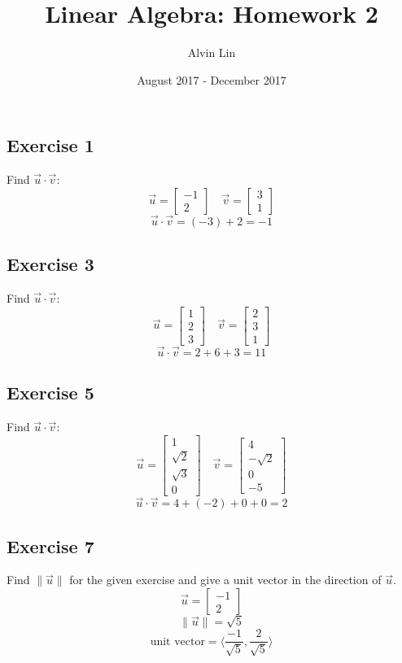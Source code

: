 \documentclass[letterpaper, 12pt]{math}
\title{Linear Algebra: Homework 2}
\author{Alvin Lin}
\date{August 2017 - December 2017}
\begin{document}
\maketitle

\subsection*{Exercise 1}
Find \( \vec{u}\cdot\vec{v} \):
\[ \vec{u} = \begin{bmatrix}-1 \\ 2\end{bmatrix} \quad
  \vec{v} = \begin{bmatrix}3 \\ 1\end{bmatrix} \]
\[ \vec{u}\cdot\vec{v} = (-3)+2 = -1 \]

\subsection*{Exercise 3}
Find \( \vec{u}\cdot\vec{v} \):
\[ \vec{u} = \begin{bmatrix}1 \\ 2 \\ 3\end{bmatrix} \quad
  \vec{v} = \begin{bmatrix}2 \\ 3 \\ 1\end{bmatrix} \]
\[ \vec{u}\cdot\vec{v} = 2+6+3 = 11 \]

\subsection*{Exercise 5}
Find \( \vec{u}\cdot\vec{v} \):
\[ \vec{u} = \begin{bmatrix}1 \\ \sqrt{2} \\ \sqrt{3} \\ 0\end{bmatrix} \quad
  \vec{v} = \begin{bmatrix}4 \\ -\sqrt{2} \\ 0 \\ -5\end{bmatrix} \]
\[ \vec{u}\cdot\vec{v} = 4+(-2)+0+0 = 2 \]

\subsection*{Exercise 7}
Find \( \|\vec{u}\| \) for the given exercise and give a unit vector in the
direction of \( \vec{u} \).
\[ \vec{u} = \begin{bmatrix}-1 \\ 2\end{bmatrix} \]
\[ \|\vec{u}\| = \sqrt{5} \]
\[ \text{unit vector} = \langle\frac{-1}{\sqrt{5}},\frac{2}{\sqrt{5}}\rangle \]
\end{document}
